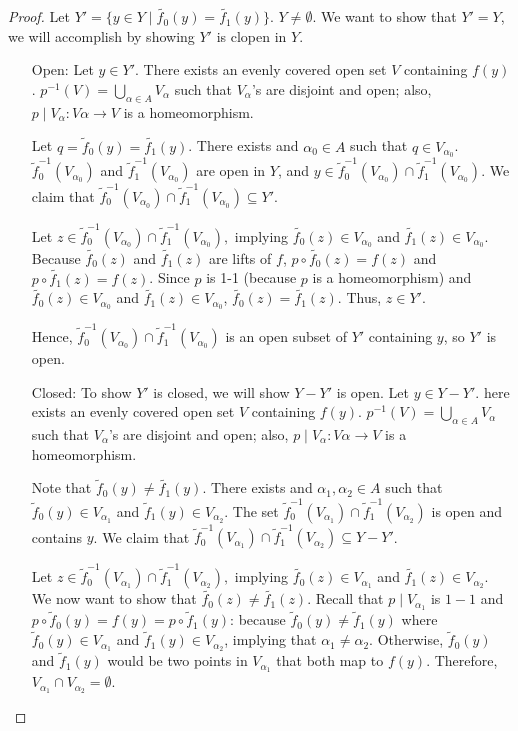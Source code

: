 \begin{proof}
	Let $Y' =\{y\in Y\mid \widetilde{f_0}(y)=\widetilde{f_1}(y)\}$. $Y\ne\emptyset$. We want to show that $Y' = Y$, we will accomplish by showing $Y'$ is clopen in $Y$. 
	\begin{itemize}
		\item[Open:] Let $y\in Y'$. There exists an evenly covered open set $V$ containing $f(y)$. $p^{-1}(V)=\displaystyle\bigcup_{\alpha\in A} V_\alpha$ such that $V_{\alpha}$'s are disjoint and open; also, $p\mid V_\alpha:V\alpha\rightarrow V$ is a homeomorphism. 
		
		Let $q= \widetilde{f}_0(y)=\widetilde{f_1}(y)$. There exists and $\alpha_0\in A$ such that $q\in V_{\alpha_0}$. $\widetilde{f}_0^{-1}(V_{\alpha_0})$ and $\widetilde{f}_1^{-1}(V_{\alpha_0})$ are open in $Y$, and $y\in \widetilde{f}_0^{-1}(V_{\alpha_0})\cap\widetilde{f}_1^{-1}(V_{\alpha_0})$. We claim that $\widetilde{f}_0^{-1}(V_{\alpha_0})\cap\widetilde{f}_1^{-1}(V_{\alpha_0})\subseteq Y'.$
		
		Let $z\in \widetilde{f}_0^{-1}(V_{\alpha_0})\cap\widetilde{f}_1^{-1}(V_{\alpha_0}),$ implying $\widetilde{f_0}(z)\in V_{\alpha_0}$ and $\widetilde{f_1}(z)\in V_{\alpha_0}$. Because $\widetilde{f_0}(z)$ and $\widetilde{f_1}(z)$ are lifts of $f$, $p\circ\widetilde{f_0}(z)=f(z)$ and $p\circ\widetilde{f_1}(z)=f(z)$. Since $p$ is 1-1 (because $p$ is a homeomorphism) and $\widetilde{f_0}(z)\in V_{\alpha_0}$ and $\widetilde{f_1}(z)\in V_{\alpha_0}$, $\widetilde{f_0}(z)=\widetilde{f_1}(z)$. Thus, $z\in Y'$.
		
		Hence, $\widetilde{f}_0^{-1}(V_{\alpha_0})\cap\widetilde{f}_1^{-1}(V_{\alpha_0})$ is an open subset of $Y'$ containing $y$, so $Y'$ is open. 
		\item[Closed:] To show $Y'$ is closed, we will show $Y-Y'$ is open. Let $y\in Y-Y'$. here exists an evenly covered open set $V$ containing $f(y)$. $p^{-1}(V)=\displaystyle\bigcup_{\alpha\in A} V_\alpha$ such that $V_{\alpha}$'s are disjoint and open; also, $p\mid V_\alpha:V\alpha\rightarrow V$ is a homeomorphism. 
		
		Note that $\widetilde{f}_0(y)\ne\widetilde{f_1}(y)$. There exists and $\alpha_1,\alpha_2\in A$ such that $\widetilde{f}_0(y)\in V_{\alpha_1}$ and $\widetilde{f}_1(y)\in V_{\alpha_2}$. The set $\widetilde{f}_0^{-1}(V_{\alpha_1})\cap\widetilde{f}_1^{-1}(V_{\alpha_2})$ is open and contains $y$. We claim that $\widetilde{f}_0^{-1}(V_{\alpha_1})\cap\widetilde{f}_1^{-1}(V_{\alpha_2})\subseteq Y-Y'$.
		
		Let $z\in \widetilde{f}_0^{-1}(V_{\alpha_1})\cap\widetilde{f}_1^{-1}(V_{\alpha_2}),$ implying $\widetilde{f_0}(z)\in V_{\alpha_1}$ and $\widetilde{f_1}(z)\in V_{\alpha_2}$. We now want to show that $\widetilde{f_0}(z)\ne\widetilde{f_1}(z)$. Recall that $p\mid V_{\alpha_1}$ is $1-1$ and $p\circ\widetilde{f}_0(y)=f(y)=p\circ\widetilde{f}_1(y)$: because $\widetilde{f}_0(y)\ne\widetilde{f}_1(y)$ where $\widetilde{f}_0(y)\in V_{\alpha_1}$ and $\widetilde{f}_1(y)\in V_{\alpha_2}$, implying that $\alpha_1\ne \alpha_2$. Otherwise, $\widetilde{f}_0(y)$ and $\widetilde{f}_1(y)$ would be two points in $V_{\alpha_1}$ that both map to $f(y)$. Therefore, $V_{\alpha_1}\cap V_{\alpha_2}=\emptyset$.
		

\end{itemize}
\end{proof}
